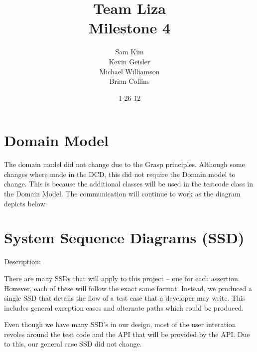 \documentclass{article}
\title{Team Liza \\ Milestone 4}
\author{Sam Kim \\ Kevin Geisler \\ Michael Williamson \\ Brian Collins}
\date{1-26-12}
\begin{document}
\maketitle
\newpage

\tableofcontents

\newpage

\section{Domain Model}

The domain model did not change due to the Grasp principles.  Although some 
changes where made in the DCD, this did not require the Domain model to change.
This is because the additional classes will be used in the testcode class in the 
Domain Model.  The communication will continue to work as the diagram depicts below:





\section{System Sequence Diagrams (SSD)}

Description:  \newline

There are many SSDs that will apply to this project -- one for each assertion. 
However, each of these will follow the exact same format. Instead, we
produced a single SSD that details the flow of a test case that a developer may
write.  This includes general exception cases and alternate paths which could be
produced.  \newline 



Even though we have many SSD's in our design, most of the user interation revoles 
around the test code and the API that will be provided by the API.  Due to this, our 
general case SSD did not change.
\end{document}
